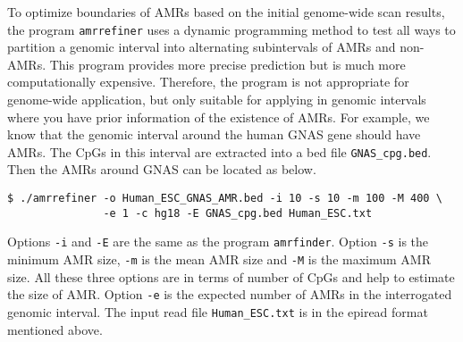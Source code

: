 \documentclass[10pt]{article}
\newcommand{\prog}[1]{\texttt{#1}}
\newcommand{\fn}[1]{\texttt{#1}}
\newcommand{\op}[1]{\texttt{#1}}
\begin{document}
To optimize boundaries of AMRs based on the initial genome-wide scan
results, the program \prog{amrrefiner} uses a dynamic programming
method to test all ways to partition a genomic interval into
alternating subintervals of AMRs and non-AMRs. This program provides
more precise prediction but is much more computationally
expensive. Therefore, the program is not appropriate for genome-wide
application, but only suitable for applying in genomic intervals where
you have prior information of the existence of AMRs. For example, we
know that the genomic interval around the human GNAS gene should have
AMRs. The CpGs in this interval are extracted into a bed file
\fn{GNAS\_cpg.bed}. Then the AMRs around GNAS can be located as below.
\begin{verbatim}
$ ./amrrefiner -o Human_ESC_GNAS_AMR.bed -i 10 -s 10 -m 100 -M 400 \
               -e 1 -c hg18 -E GNAS_cpg.bed Human_ESC.txt
\end{verbatim}
Options \op{-i} and \op{-E} are the same as the program
\prog{amrfinder}. Option \op{-s} is the minimum AMR size, \op{-m} is
the mean AMR size and \op{-M} is the maximum AMR size. All these three
options are in terms of number of CpGs and help to estimate the size
of AMR. Option \op{-e} is the expected number of AMRs in the
interrogated genomic interval. The input read file \fn{Human\_ESC.txt}
is in the epiread format mentioned above.


\end{document}
